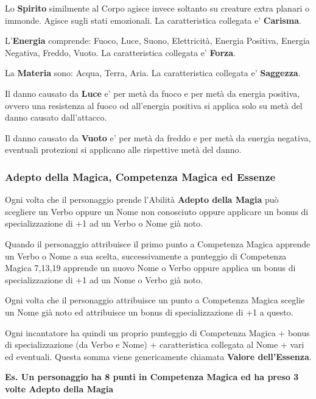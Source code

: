 \documentclass[a4paper,twoside,openany]{book}
\begin{document}
\begin{multicols}{2}
Lo \textbf{Spirito} similmente al Corpo agisce invece soltanto su creature extra planari o immonde. Agisce sugli stati emozionali. La caratteristica collegata e' \textbf{Carisma}.

L'\textbf{Energia} comprende: Fuoco, Luce, Suono, Elettricità, Energia Positiva, Energia Negativa, Freddo, Vuoto. La caratteristica collegata e' \textbf{Forza}.

La \textbf{Materia} sono: Acqua, Terra, Aria. La caratteristica collegata e' \textbf{Saggezza}.

\smallskip

Il danno causato da \textbf{Luce} e' per metà da fuoco e per metà da energia positiva, ovvero una resistenza al fuoco od all'energia positiva si applica solo su metà del danno causato dall'attacco.

Il danno causato da \textbf{Vuoto} e' per metà da freddo e per metà da energia negativa, eventuali protezioni si applicano alle rispettive metà del danno.

\subsubsection{Adepto della Magica, Competenza Magica ed Essenze}

\label{competenza-magica-ed-essenza}

Ogni volta che il personaggio prende l'Abilità \textbf{Adepto della Magia} può scegliere un Verbo oppure un Nome non conosciuto oppure applicare un bonus di specializzazione di +1 ad un Verbo o Nome già noto.

Quando il personaggio attribuisce il primo punto a Competenza Magica apprende un Verbo o Nome a sua scelta, successivamente a punteggio di Competenza Magica 7,13,19 apprende un nuovo Nome o Verbo oppure applica un bonus di specializzazione di +1 ad un Nome o Verbo già noto.

Ogni volta che il personaggio attribuisce un punto a Competenza Magica sceglie un Nome già noto ed attribuisce un bonus di specializzazione di +1 a questo.

Ogni incantatore ha quindi un proprio punteggio di Competenza Magica + bonus di specializzazione (da Verbo e Nome) + caratteristica collegata al Nome + vari ed eventuali. Questa somma viene genericamente chiamata \textbf{Valore dell'Essenza}.

\bigskip

\textbf{Es. Un personaggio ha 8 punti in Competenza Magica ed ha preso 3 volte Adepto della Magia}


\end{multicols}
\end{document}
